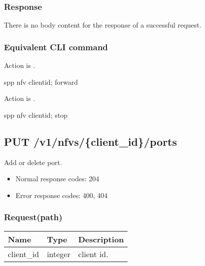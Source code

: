 \documentclass[a4paper,11pt,openany,oneside,english]{sphinxmanual}
\begin{document}
\subsubsection{Response}
\label{\detokenize{api_ref/spp_nfv:id3}}
There is no body content for the response of a successful  request.


\subsubsection{Equivalent CLI command}
\label{\detokenize{api_ref/spp_nfv:id4}}
Action is .

\begin{sphinxVerbatim}[commandchars=\\\{\},formatcom=\footnotesize]
spp \PYGZgt{} nfv \PYGZob{}client\PYGZus{}id\PYGZcb{}; forward
\end{sphinxVerbatim}

Action is .

\begin{sphinxVerbatim}[commandchars=\\\{\},formatcom=\footnotesize]
spp \PYGZgt{} nfv \PYGZob{}client\PYGZus{}id\PYGZcb{}; stop
\end{sphinxVerbatim}


\subsection{PUT /v1/nfvs/\{client\_id\}/ports}
\label{\detokenize{api_ref/spp_nfv:put-v1-nfvs-client-id-ports}}
Add or delete port.
\begin{itemize}
\item {} 
Normal response codes: 204

\item {} 
Error response codes: 400, 404

\end{itemize}


\subsubsection{Request(path)}
\label{\detokenize{api_ref/spp_nfv:id5}}

\begin{savenotes}\sphinxattablestart
\centering
{}
\sphinxthecaptionisattop
{}\label{\detokenize{api_ref/spp_nfv:id28}}\label{\detokenize{api_ref/spp_nfv:table-spp-ctl-spp-nfv-ports-get}}
\sphinxaftertopcaption
\begin{tabulary}{\linewidth}[t]{|T|T|T|}
\hline
\sphinxstyletheadfamily 
Name
&\sphinxstyletheadfamily 
Type
&\sphinxstyletheadfamily 
Description
\\
\hline
client\_id
&
integer
&
client id.
\\
\hline
\end{tabulary}
\par
\sphinxattableend\end{savenotes}
\end{document}
